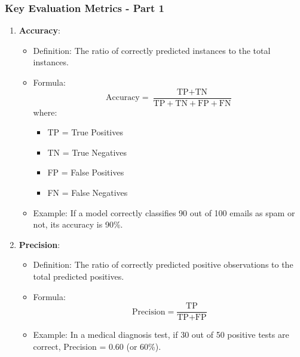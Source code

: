 \documentclass[aspectratio=169]{beamer}
\begin{document}
\begin{frame}[fragile]
    \frametitle{Key Evaluation Metrics - Part 1}
    \begin{enumerate}
        \item \textbf{Accuracy}:
        \begin{itemize}
            \item Definition: The ratio of correctly predicted instances to the total instances.
            \item Formula: 
            \begin{equation}
            \text{Accuracy} = \frac{\text{TP} + \text{TN}}{\text{TP} + \text{TN} + \text{FP} + \text{FN}}
            \end{equation}
            where:
            \begin{itemize}
                \item TP = True Positives
                \item TN = True Negatives
                \item FP = False Positives
                \item FN = False Negatives
            \end{itemize}
            \item Example: If a model correctly classifies 90 out of 100 emails as spam or not, its accuracy is 90\%.
        \end{itemize}

        \item \textbf{Precision}:
        \begin{itemize}
            \item Definition: The ratio of correctly predicted positive observations to the total predicted positives.
            \item Formula: 
            \begin{equation}
            \text{Precision} = \frac{\text{TP}}{\text{TP} + \text{FP}}
            \end{equation}
            \item Example: In a medical diagnosis test, if 30 out of 50 positive tests are correct, Precision = 0.60 (or 60\%).
        \end{itemize}
    \end{enumerate}
\end{frame}
\end{document}
